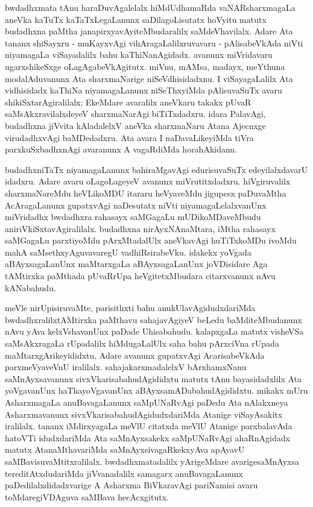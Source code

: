 bwdadhxmata tAnu haraDuvAgalelalx hiMdUdhamaRda vaNARsharxmagaLa aneVka kaTuTx kaTaTxLegaLanunx saDilagoLisutatx hoVyitu matutx budadhxna paMtha janapirxyavAyi\-teMbuda\-ralilx saMdeVhavilalx. Adare Ata tananx shiSayxru - muKayxvAgi vihAragaLalilxruvavaru - pAlisabeVkAda niVti niyamagaLa viSayadalilx bahu kaThiNanAgidadx. avanunx miVridavaru ugarxshikeSxge oLagAgabeVkAgitutx. miVnu, mAMsa, madayx, meYthuna modalAduvanunx Ata sharxmaNarige niSeVdhisidadxnu. I viSayagaLalilx Ata vidhisidadx kaThiNa niyamagaLanunx niSeThxyiMda pAlisuvaSuTx avaru shikiSxtarAgiralilalx; EkeMdare avaralilx aneVkaru takakx pUvaR saMsAkxravilalxdeyeV sharxmaNarAgi biTiTxdadxru. idara PalavAgi, budadhxna jiVvita kAladalelxV aneVka sharxmaNaru Atana Ajecnxge virudadhxvAgi baMDedadxru. Ata avara I naDavaLikeyiMda tiVra parxkuSxbadhxnAgi avaranunx A vagaRdiMda horahAkidanu.

budadhxniTaTx niyamagaLanunx bahiraMgavAgi edurisuvaSuTx edeyilalxdavarU idadxru. Adare avaru oLagoLageyeV avanunx miVrutitxdadxru. hiVgiruvalilx sharxmaNareMdu heVLikoMDU itararu heVyaveMdu jigupesx paDuvaMtha AcAragaLanunx gupatxvAgi naDesutatx niVti niyamagaLelalxvanUnx miVridadhx bwdadhxra rahasayx saMGagaLu mUDikoMDaveMbudu aniriVkiSxtavAgiralilalx. budadhxna nirAyxNAnaMtara, iMtha rahasayx saMGagaLu parxtiyoMdu pArxMtadalUlx aneVkavAgi huTiTxkoMDu ivoMdu mahA saMsethxyAguvavaregU vadhiRsirabeVku. idakekx yoVgada aBAyxsagaLanUnx maMtarxgaLa aBAyxsagaLanUnx joVDisidare Aga tAMtirxka paMthada pUvaRrUpa heVgitetxMbudara citarxvanunx nAvu kANabahudu.

meVle nirUpisiruvaMte, parisithxti bahu anukUlavAgidudxdariMda bwdadhxralilx\break tAMtirxka paMthavu sahajavAgiyeV beLedu baMditeMbudanunx nAvu yAva kelxVshavanUnx paDade Uhisabahudu. kalapxgaLa matutx visheVSa saMsAkxragaLa rUpadalilx hiMdugaLalUlx saha bahu pArxciVna rUpada maMtarxgArikeyididxtu, Adare avanunx gupatxvAgi Acarisa\-beVkAda parxmeVyaveVnU iralilalx. sahajakarxmadalelxV bArxhamxNanu saMnAyxsavanunx sivxVkarisa\-bahudAgididxtu matutx tAnu bayasidadxlilx Ata yoVgavanUnx haThayoVgavanUnx aBAyxsa\break mADabahudAgididxtu. mikakx mUru AsharxmagaLa anuBavagaLanunx saMpUNaRvAgi \hbox{paDedu} Ata nAlakxneya Asharxmavanunx sivxVkarisabahudAgidudxdariMda Atanige viSayAsakitx iralilalx. tananx iMdirxyagaLa meVlU citatxda meVlU Atanige parxbalavAda hatoVTi idudxdariMda Ata saMnAyxsakekx saMpUNaRvAgi ahaRnAgidadx matutx AtanaMthavariMda saMnAyxsivagaRkekx\break yAva apAyavU saMBavisuvaMtitxralilalx. bwdadhxmatadalilx yArigeMdare avarige\break \hbox{saMnAyxsa} tereditAtxdudariMda jiVvanadalilx samagarx anuBavagaLanunx paDedilalxdidadxvarige A Asharxma BiVkaravAgi pariNamisi avaru toMdaregiVDAguva saMBava hecAcxgitutx.

